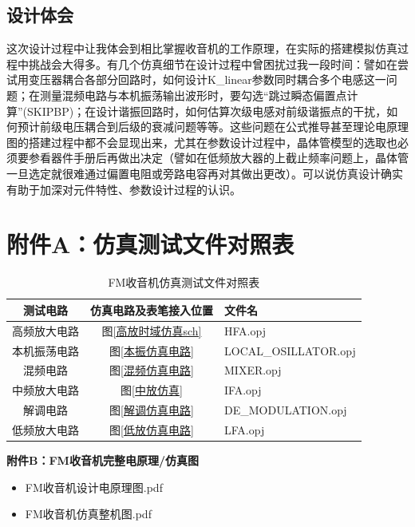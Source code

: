 \documentclass[a4paper,12pt,twoside]{article}
\begin{document}
\subsection{设计体会}
这次设计过程中让我体会到相比掌握收音机的工作原理，在实际的搭建模拟仿真过程中挑战会大得多。有几个仿真细节在设计过程中曾困扰过我一段时间：譬如在尝试用变压器耦合各部分回路时，如何设计K\_linear参数同时耦合多个电感这一问题；在测量混频电路与本机振荡输出波形时，要勾选“跳过瞬态偏置点计算”(SKIPBP)；在设计谐振回路时，如何估算次级电感对前级谐振点的干扰，如何预计前级电压耦合到后级的衰减问题等等。这些问题在公式推导甚至理论电原理图的搭建过程中都不会显现出来，尤其在参数设计过程中，晶体管模型的选取也必须要参看器件手册后再做出决定（譬如在低频放大器的上截止频率问题上，晶体管一旦选定就很难通过偏置电阻或旁路电容再对其做出更改）。可以说仿真设计确实有助于加深对元件特性、参数设计过程的认识。



\section{附件A：仿真测试文件对照表}
\begin{table}[H]
    \centering
    \begin{tabular}{ccl}
    \toprule[1.2pt]
    \midrule
      测试电路 & 仿真电路及表笔接入位置 & 文件名 \\
      \midrule
      高频放大电路  & 图\ref{高放时域仿真sch} & HFA.opj \\
        本机振荡电路 & 图\ref{本振仿真电路} & LOCAL\_OSILLATOR.opj \\
        混频电路 & 图\ref{混频仿真电路} & MIXER.opj\\
          中频放大电路 & 图\ref{中放仿真} & IFA.opj\\
          解调电路 & 图\ref{解调仿真电路} &DE\_MODULATION.opj \\
          低频放大电路  & 图\ref{低放仿真电路} & LFA.opj \\
            \bottomrule[1.2pt]
    \end{tabular}
    \caption{FM收音机仿真测试文件对照表}
    \label{仿真文件}
\end{table}

\hspace{2pt} \Large{\textbf{附件B：FM收音机完整电原理/仿真图}}

\normalsize

\begin{itemize}
    \item  FM收音机设计电原理图.pdf
    
    \item  FM收音机仿真整机图.pdf
\end{itemize}  


\printbibliography
\end{document}
